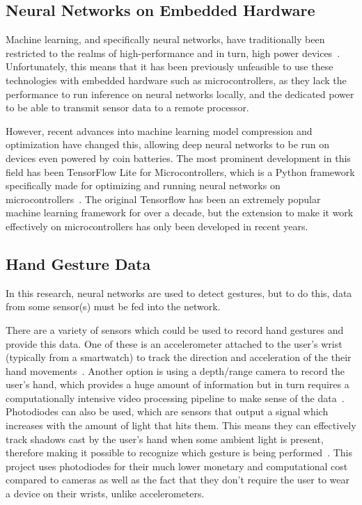 \subsection{Neural Networks on Embedded Hardware}\label{subsec:machine-learning-on-microcontrollers}
Machine learning, and specifically neural networks, have traditionally been restricted to the realms of high-performance and in turn, high power devices~\cite{8342164}.
Unfortunately, this means that it has been previously unfeasible to use these technologies with embedded hardware such as microcontrollers, as they lack the performance to run inference on neural networks locally, and the dedicated power to be able to transmit sensor data to a remote processor.

However, recent advances into machine learning model compression and optimization have changed this, allowing deep neural networks to be run on devices even powered by coin batteries.
The most prominent development in this field has been TensorFlow Lite for Microcontrollers, which is a Python framework specifically made for optimizing and running neural networks on microcontrollers~\cite{MLSYS2021_d2ddea18}.
The original Tensorflow has been an extremely popular machine learning framework for over a decade, but the extension to make it work effectively on microcontrollers has only been developed in recent years.

\subsection{Hand Gesture Data}\label{subsec:hand-gesture-data}
In this research, neural networks are used to detect gestures, but to do this, data from some sensor(s) must be fed into the network.

There are a variety of sensors which could be used to record hand gestures and provide this data.
One of these is an accelerometer attached to the user's wrist (typically from a smartwatch) to track the direction and acceleration of the their hand movements~\cite{4912759}.
Another option is using a depth/range camera to record the user's hand, which provides a huge amount of information but in turn requires a computationally intensive video processing pipeline to make sense of the data~\cite{article}.
Photodiodes can also be used, which are sensors that output a signal which increases with the amount of light that hits them.
This means they can effectively track shadows cast by the user's hand when some ambient light is present, therefore making it possible to recognize which gesture is being performed~\cite{8947919}.
This project uses photodiodes for their much lower monetary and computational cost compared to cameras as well as the fact that they don't require the user to wear a device on their wrists, unlike accelerometers.
